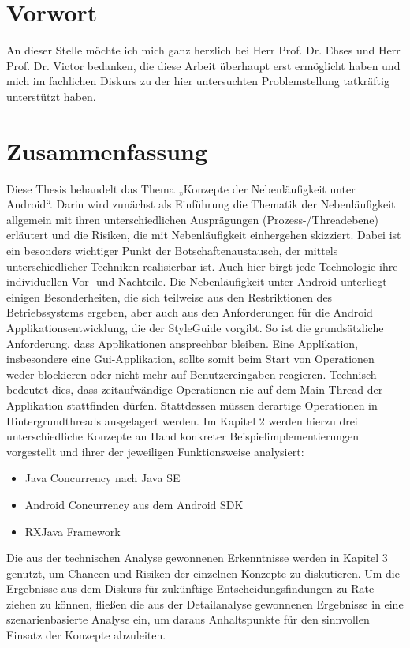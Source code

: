 \documentclass[12pt,oneside,a4paper,bibtotoc,liststotoc]{scrreprt}
\begin{document}
\onehalfspacing %

\chapter*{Vorwort}
An dieser Stelle möchte ich mich ganz herzlich bei Herr Prof. Dr. Ehses und Herr Prof. Dr. Victor bedanken, die diese Arbeit überhaupt erst ermöglicht haben und mich im fachlichen Diskurs zu der hier untersuchten Problemstellung tatkräftig unterstützt haben.

\chapter*{Zusammenfassung}
Diese Thesis behandelt das Thema „Konzepte der Nebenläufigkeit unter Android“. Darin wird zunächst als Einführung die Thematik der Nebenläufigkeit allgemein mit ihren unterschiedlichen Ausprägungen (Prozess-/Threadebene) erläutert und die Risiken, die mit Nebenläufigkeit einhergehen skizziert. Dabei ist ein besonders wichtiger Punkt der Botschaftenaustausch, der mittels unterschiedlicher Techniken realisierbar ist. Auch hier birgt jede Technologie ihre individuellen Vor- und Nachteile.
Die Nebenläufigkeit unter Android unterliegt einigen Besonderheiten, die sich teilweise aus den Restriktionen des Betriebssystems ergeben, aber auch aus den Anforderungen für die Android Applikationsentwicklung, die der StyleGuide vorgibt. So ist die grundsätzliche Anforderung, dass Applikationen ansprechbar bleiben. Eine Applikation, insbesondere eine Gui-Applikation, sollte somit beim Start von Operationen weder blockieren oder nicht mehr auf Benutzereingaben reagieren. Technisch bedeutet dies, dass zeitaufwändige Operationen nie auf dem Main-Thread der Applikation stattfinden dürfen. Stattdessen müssen derartige Operationen in Hintergrundthreads ausgelagert werden. Im Kapitel 2 werden hierzu drei unterschiedliche Konzepte an Hand konkreter Beispielimplementierungen vorgestellt und ihrer der jeweiligen Funktionsweise analysiert:
\begin{itemize}
\item Java Concurrency nach Java SE
\item Android Concurrency aus dem Android SDK
\item RXJava Framework
\end{itemize}
Die aus der technischen Analyse gewonnenen Erkenntnisse werden in Kapitel 3 genutzt, um Chancen und Risiken der einzelnen Konzepte zu diskutieren. Um die Ergebnisse aus dem Diskurs für zukünftige Entscheidungsfindungen zu Rate ziehen zu können, fließen die aus der Detailanalyse gewonnenen Ergebnisse in eine szenarienbasierte Analyse ein, um daraus Anhaltspunkte für den sinnvollen Einsatz der Konzepte abzuleiten.
\end{document}
